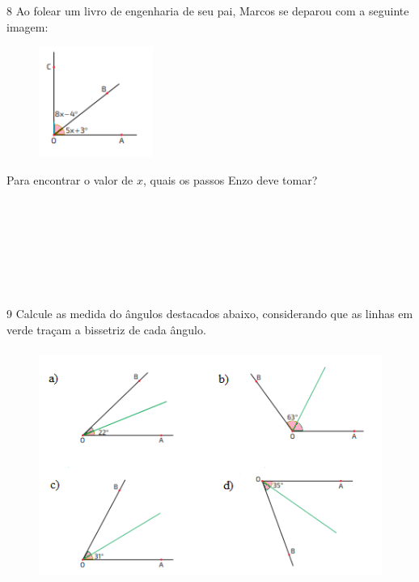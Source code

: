 \num{8} Ao folear um livro de engenharia de seu pai, Marcos se deparou com a
seguinte imagem:

\begin{figure}[H]
\centering\includegraphics[width=1.47134in,height=1.42708in]{./imgSAEB_8_MAT/media/image31.png}
\end{figure}

Para encontrar o valor de $x$, quais os passos Enzo deve tomar?

\\
\\
\\
\\
\\
\\

\pagebreak

\num{9} Calcule as medida do ângulos destacados abaixo, considerando que as
linhas em verde traçam a bissetriz de cada ângulo.

\begin{figure}[H]
\centering\includegraphics[width=4.66667in,height=3in]{./imgSAEB_8_MAT/media/image32.png}
\end{figure}

